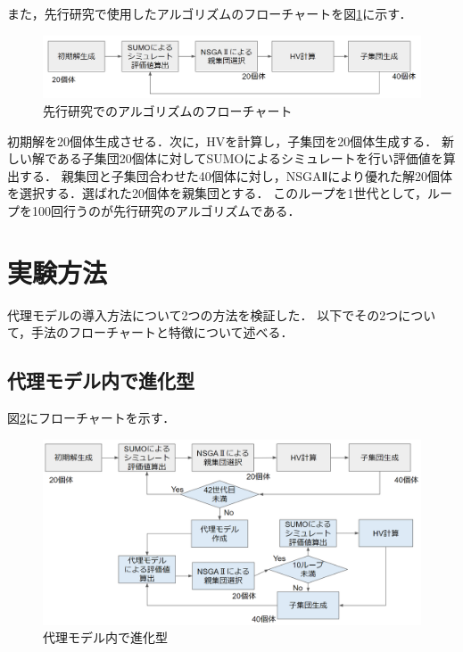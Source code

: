 \documentclass[main]{subfiles}
\begin{document}
    また，先行研究で使用したアルゴリズムのフローチャートを図\ref{old_algo}に示す．
    \begin{figure}
        \centering
        \includegraphics[width=\linewidth]{figures/old_algo.png}
        \caption{先行研究でのアルゴリズムのフローチャート}
        \label{old_algo}
    \end{figure}
    初期解を20個体生成させる．次に，HVを計算し，子集団を20個体生成する．
    新しい解である子集団20個体に対してSUMOによるシミュレートを行い評価値を算出する．
    親集団と子集団合わせた40個体に対し，NSGAⅡにより優れた解20個体を選択する．選ばれた20個体を親集団とする．
    このループを1世代として，ループを100回行うのが先行研究のアルゴリズムである．

    \section{実験方法}
    代理モデルの導入方法について2つの方法を検証した．
    以下でその2つについて，手法のフローチャートと特徴について述べる．
        \subsection{代理モデル内で進化型}
        図\ref{d}にフローチャートを示す．
        \begin{figure}
            \centering
            \includegraphics[width=\linewidth]{figures/d.png}
            \caption{代理モデル内で進化型}
            \label{d}
        \end{figure}
\end{document}
